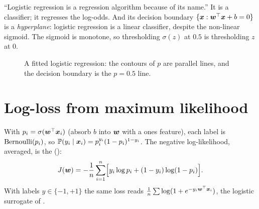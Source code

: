 \begin{remark}
	\trap ``Logistic regression is a regression algorithm because of its name.'' It is a
	classifier; it regresses the log-odds. And its decision boundary $\{{\bm{x}}:{\bm{w}}^{\top}{\bm{x}}+b=0\}$ is a
	\emph{hyperplane}: logistic regression is a linear classifier, despite the non-linear sigmoid.
	The sigmoid is monotone, so thresholding $\sigma(z)$ at $0.5$ is thresholding $z$ at $0$.
\end{remark}

\begin{figure}[ht]
	\centering
	\caption{A fitted logistic regression: the contours of $p$ are parallel lines, and the
		decision boundary is the $p=0.5$ line.}
	\label{fig:logreg-boundary}
\end{figure}

\section{Log-loss from maximum likelihood}

With $p_i=\sigma({\bm{w}}^{\top}{\bm{x}}_i)$ (absorb $b$ into ${\bm{w}}$ with a ones feature), each label is
$\operatorname{Bernoulli}(p_i)$, so $\mathbb{P}(y_i\mid{\bm{x}}_i)=p_i^{y_i}(1-p_i)^{1-y_i}$. The negative log-likelihood, averaged,
is the  ():
\[ J({\bm{w}})=-\frac1n\sum_{i=1}^n\Bigl[y_i\log p_i+(1-y_i)\log(1-p_i)\Bigr]. \]
With labels $y\in\{-1,+1\}$ the same loss reads $\frac1n\sum\log(1+e^{-y_i{\bm{w}}^{\top}{\bm{x}}_i})$, the logistic
surrogate of .

